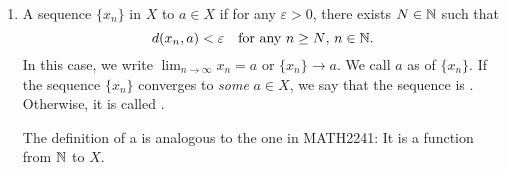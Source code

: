 \begin{enumerate}
\item A sequence \(\{x_n\}\) in \(X\)  to \(a\in X\) if for any
\(\varepsilon>0\), there exists \(N\in\mathbb{N}\) such that
\[
d(x_n,a)<\varepsilon\quad\text{for any \(n\ge N\), \(n\in\mathbb{N}\).}
\]
In this case, we write \(\displaystyle \lim_{n\to \infty}x_n=a\) or
\(\{x_n\}\to a\). We call \(a\) as  of \(\{x_n\}\). If the sequence
\(\{x_n\}\) converges to \emph{some} \(a\in X\), we say that the sequence is
. Otherwise, it is called .

\begin{note}
The definition of a  is analogous to the one in MATH2241: It is
a function from \(\mathbb{N}\) to \(X\).
\end{note}


\end{enumerate}
